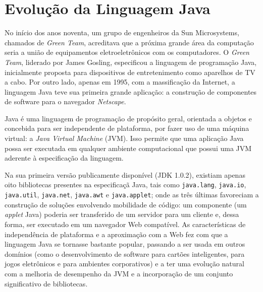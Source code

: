 \section{Evolução da Linguagem Java}\label{sec:evolucaoJava}
No início dos anos noventa, um grupo de engenheiros da Sun Microsystems, chamados de \textit{Green Team}, acreditava que a próxima grande \'{a}rea da computação seria a união de equipamentos eletroeletrônicos com os 
computadores. O \textit{Green Team}, liderado por James Gosling, especificou a linguagem de programação Java, 
inicialmente proposta para dispositivos de entretenimento como aparelhos de TV a cabo. Por outro lado, apenas em \num{1995}, com a massificação da Internet, a linguagem Java teve sua primeira grande aplicação: a construção de componentes de software para o navegador \textit{Netscape}.

Java é uma linguagem de programação de propósito geral, orientada a objetos e concebida para ser independente de plataforma, por fazer uso de uma máquina virtual: a \emph{Java Virtual Machine} (JVM). Isso permite que uma aplicação Java possa ser executada em qualquer ambiente computacional que possui uma JVM aderente à especificação da linguagem.

Na sua primeira versão publicamente disponível (\acs{JDK} 1.0.2), existiam apenas oito bibliotecas 
presentes na especifica\c c\~{a} Java, tais como \texttt{java.lang}, \texttt{java.io}, \texttt{java.util},  
\texttt{java.net}, \texttt{java.awt} e \texttt{java.applet}; onde as tr\^{e}s \'{u}ltimas favoreciam a constru\c c\~{a}o de solu\c c\~{o}es envolvendo mobilidade de c\'{o}digo: um componente (um \textit{applet} Java) poderia ser transferido de um servidor para um cliente e, dessa forma, ser executado em um navegador Web compat\'{i}vel. As caracter\'{i}sticas de independ\^{e}ncia de plataforma e a aproxima\c c\~{a}o com a Web fez com que a linguagem Java se tornasse bastante popular, passando a ser usada em outros dom\'{i}nios (como o desenvolvimento de software 
para cart\~{o}es inteligentes, para jogos eletr\^{o}nicos e para ambientes corporativos) e a ter uma evolu\c c\~{a}o natural com a melhoria de desempenho da JVM e a incorpora\c c\~{a}o de um conjunto significativo de  bibliotecas. 

